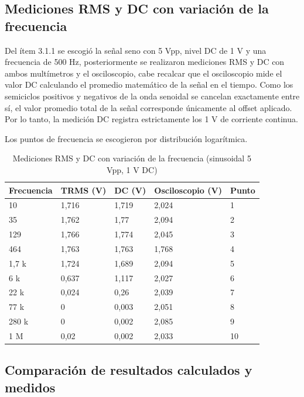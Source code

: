 \documentclass[journal, a4paper]{IEEEtran}
\begin{document}
\subsection{Mediciones RMS y DC con variación de la frecuencia}

Del ítem 3.1.1 se escogió la señal seno con 5 Vpp, nivel DC de 1 V y una frecuencia de 500 Hz, posteriormente se realizaron mediciones RMS y DC con ambos multímetros y el osciloscopio, cabe recalcar que el osciloscopio mide el valor DC calculando el promedio matemático de la señal en el tiempo. Como los semiciclos positivos y negativos de la onda senoidal se cancelan exactamente entre sí, el valor promedio total de la señal corresponde únicamente al offset aplicado. Por lo tanto, la medición DC registra estrictamente los 1 V de corriente continua.

Los puntos de frecuencia se escogieron por distribución logarítmica.

\begin{table}[H]
\centering
\caption{Mediciones RMS y DC con variación de la frecuencia (sinusoidal 5 Vpp, 1 V DC)}
\label{tab:rms_dc_frecuencia}
\begin{tabular}{|l|l|l|l|l|}
\hline
\textbf{Frecuencia} & \textbf{TRMS (V)} & \textbf{DC (V)} & \textbf{Osciloscopio (V)} & \textbf{Punto} \\
\hline
10 & 1,716 & 1,719 & 2,024 & 1 \\
\hline
35 & 1,762 & 1,77 & 2,094 & 2 \\
\hline
129 & 1,766 & 1,774 & 2,045 & 3 \\
\hline
464 & 1,763 & 1,763 & 1,768 & 4 \\
\hline
1,7 k & 1,724 & 1,689 & 2,094 & 5 \\
\hline
6 k & 0,637 & 1,117 & 2,027 & 6 \\
\hline
22 k & 0,024 & 0,26 & 2,039 & 7 \\
\hline
77 k & 0 & 0,003 & 2,051 & 8 \\
\hline
280 k & 0 & 0,002 & 2,085 & 9 \\
\hline
1 M & 0,02 & 0,002 & 2,033 & 10 \\
\hline
\end{tabular}
\end{table}

\subsection{Comparación de resultados calculados y medidos}
\end{document}
